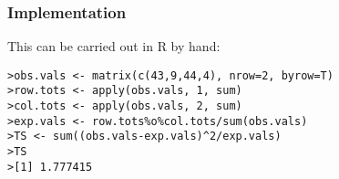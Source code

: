 \subsubsection{Implementation}

This can be carried out in R by hand:

\footnotesize \begin{verbatim}
>obs.vals <- matrix(c(43,9,44,4), nrow=2, byrow=T)
>row.tots <- apply(obs.vals, 1, sum)
>col.tots <- apply(obs.vals, 2, sum)
>exp.vals <- row.tots%o%col.tots/sum(obs.vals)
>TS <- sum((obs.vals-exp.vals)^2/exp.vals)
>TS
>[1] 1.777415
\end{verbatim}\normalsize

